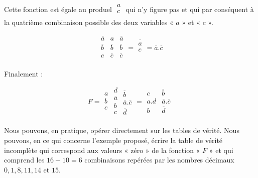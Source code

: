 Cette fonction est égale au produel $\begin{array}{|c|} a \\ c\\ \end{array} $ qui n'y figure pas et qui par conséquent à la quatrième combinaison possible des deux variables « $a$ » et « $c$ ». 


 
 \[
 \begin{array}{|c|c|c|} \overline{a} & a & \overline{a} \\
                       \overline{b} &  \overline{b} &  \overline{b} \\
                      c            &  \overline{c} &  \overline{c}  \\    
\end{array}  = \overline{\begin{array}{|c|} a \\ c\\ \end{array} } 
             = \overline{a} . \overline{c} 
 \]
 


Finalement : 



\[ F = 
\begin{array}{|c}  a \\ b \\ c \\  \end{array} \begin{array}{|c|} d \\ \overline{a} \\  b \\ c \\ \end{array} \begin{array}{c|}  \overline{b} \\ \overline{a} . \overline{c} \\
\overline{d} \end{array}  
   = \begin{array}{|c|c|} c & \overline{b} \\ a . d & \overline{a} . \overline{c} \\ b & \overline{d} \\ \end{array}  
\]



Nous pouvons, en pratique, opérer directement sur les tables de vérité. Nous pouvons, en ce qui concerne l'exemple proposé, écrire la table de vérité incomplète qui correspond aux valeurs « zéro » de la fonction « $F$ » et qui comprend les $16 - 10 = 6$ combinaisons repérées par les nombres décimaux  $0, 1, 8, 11, 14$ et $15$. 

